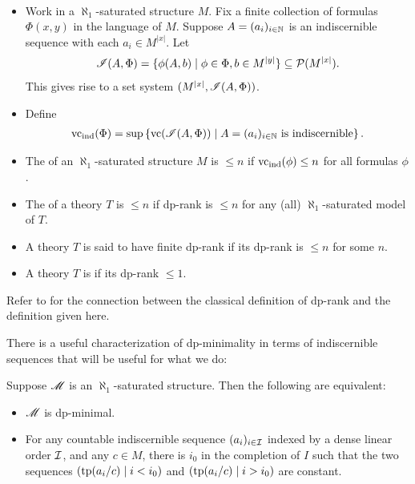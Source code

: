 \begin{Definition} \label{def_dp} \ 
  \begin{itemize}
  \item
    Work in a $\aleph_1$-saturated structure $M$.
    Fix a finite collection of formulas $\Phi(x, y)$ in the language of $M$.
    Suppose $A = (a_i)_{i \in \mathbb{N}}$ is an indiscernible sequence with each $a_i \in M^{|x|}$.
    Let
    \begin{align*}
      \mathscr I(A, \Phi) = \{\phi(A, b) \mid \phi \in \Phi, b \in M^{|y|}\} \subseteq \mathcal P(M^{|x|}).
    \end{align*}
    This gives rise to a set system $(M^{|x|}, \mathscr I(A, \Phi))$.
  \item Define
    \begin{align*}
      \operatorname{vc}_{\operatorname{ind}}(\Phi) = \sup \left\{\operatorname{vc}(\mathscr I(A, \Phi)) \mid A = (a_i)_{i \in \mathbb{N}} \text{ is indiscernible}\right\}.
    \end{align*}
  \item The  of an $\aleph_1$-saturated structure $M$ is $\leq n$ if $\operatorname{vc}_{\operatorname{ind}}(\phi) \leq n$ for all formulas $\phi$.
  \item The \defn{dp-rank} of a theory $T$ is $\leq n$ if dp-rank is $\leq n$ for any (all) $\aleph_1$-saturated model of $T$.
  \item A theory $T$ is said to have finite dp-rank if its dp-rank is $\leq n$ for some $n$.
  \item A theory $T$ is \defn{dp-minimal} if its dp-rank $\leq 1$.
  \end{itemize}
\end{Definition}

Refer to \cite{guingona} for the connection between the classical definition of dp-rank and the definition given here.

There is a useful characterization of dp-minimality in terms of indiscernible sequences that will be useful for what we do:
\begin{Lemma} [see Lemma 1.4 in \cite{simon_dp_min}] \label{dp_min_simon}
  Suppose $\mathscr M$ is an $\aleph_1$-saturated structure.
  Then the following are equivalent:
  \begin{itemize}
  \item $\mathscr M$ is dp-minimal.
  \item For any countable indiscernible sequence $(a_i)_{i \in \operatorname{\mathcal I}}$ indexed by a dense linear order $\operatorname{\mathcal I}$,
    and any $c \in M$, there is $i_0$ in the completion of $I$
    such that the two sequences $\left(\operatorname{tp}(a_i/c) \mid i < i_0\right)$ and
    $\left(\operatorname{tp}(a_i/c) \mid i > i_0\right)$ are constant.
  \end{itemize}
\end{Lemma}

